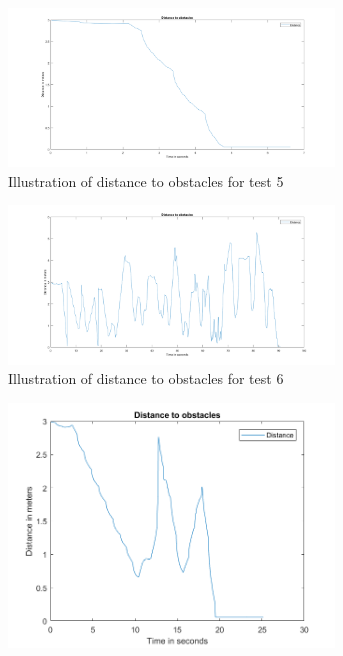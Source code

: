 \documentclass[../Head/Main.tex]{subfiles}
\begin{document}
\begin{figure}[H]
  \begin{subfigure}[b]{0.49\textwidth}
  \centering
  \includegraphics[width=0.95\textwidth]{../Figures/MatlabPlots/MarblesTest5}
    \caption{Illustration of distance to obstacles for test 5}
    \label{fig:MarbleTest5}
  \end{subfigure}
  \hfill
  \begin{subfigure}[b]{0.49\textwidth}
    \centering
    \includegraphics[width=0.95\textwidth]{../Figures/MatlabPlots/MarblesTest6}
    \caption{Illustration of distance to obstacles for test 6}
    \label{fig:MarbleTest6}
  \end{subfigure}
  \hfill
  \begin{subfigure}[b]{0.49\textwidth}
  \centering
  \includegraphics[width=0.95\textwidth]{../Figures/MatlabPlots/MarblesTest7}

\end{subfigure}
\end{figure}
\end{document}
